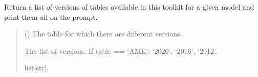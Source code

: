 \documentclass[letterpaper,10pt,english]{sphinxmanual}
\begin{document}
\begin{fulllineitems}
\label{\detokenize{source/api/setup_nuc_be_exp:nucleardatapy.nuc.setup_be_exp.be_exp_versions}}
\pysigstartsignatures
{}
\pysigstopsignatures
\sphinxAtStartPar
Return a list of versions of tables available in
this toolkit for a given model and print them all on the prompt.
\begin{quote}\begin{description}
\sphinxAtStartPar
{} () \textendash{} The table for which there are different versions.

\sphinxAtStartPar
The list of versions.     If table == ‘AME’: ‘2020’, ‘2016’, ‘2012’.

\sphinxAtStartPar
list{[}str{]}.

\end{description}\end{quote}

\end{fulllineitems}

\end{document}
